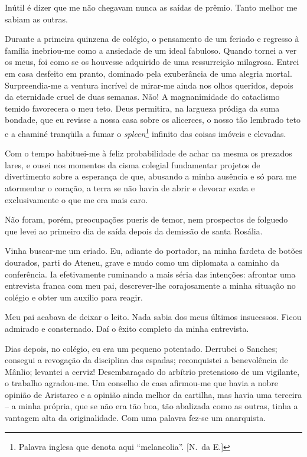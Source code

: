 Inútil é dizer que me não chegavam nunca as
saídas de prêmio. Tanto melhor me sabiam as outras. 

Durante a primeira
quinzena de colégio, o pensamento de um feriado e regresso à família
inebriou{}-me como a ansiedade de um ideal fabuloso. Quando tornei a ver
os meus, foi como se os houvesse adquirido de uma ressurreição
milagrosa. Entrei em casa desfeito em pranto, dominado pela exuberância
de uma alegria mortal. Surpreendia{}-me a ventura incrível de
mirar{}-me ainda nos olhos queridos, depois da eternidade cruel de duas
semanas. Não! A magnanimidade do cataclismo temido favorecera o meu
teto. Deus permitira, na largueza pródiga da suma bondade, que eu
revisse a nossa casa sobre os alicerces, o nosso tão lembrado teto e a
chaminé tranqüila a fumar o \textit{spleen}\footnote{ Palavra inglesa que denota aqui ``melancolia''. 
[N.~da E.]} infinito das coisas imóveis e elevadas. 

Com o tempo habituei{}-me à feliz probabilidade de achar na
mesma os prezados lares, e ousei nos momentos da cisma colegial
fundamentar projetos de divertimento sobre a esperança de que, abusando
a minha ausência e só para me atormentar o coração, a terra se não
havia de abrir e devorar exata e exclusivamente o que me era mais caro.

Não foram, porém, preocupações pueris de temor, nem prospectos de
folguedo que levei ao primeiro dia de saída depois da demissão de santa
Rosália. 

Vinha buscar{}-me um criado. Eu, adiante do portador, na minha
fardeta de botões dourados, parti do Ateneu, grave e mudo como um
diplomata a caminho da conferência. Ia efetivamente ruminando a mais
séria das intenções: afrontar uma entrevista franca com meu pai,
descrever{}-lhe corajosamente a minha situação no colégio e obter um
auxílio para reagir. 

Meu pai acabava de deixar o leito. Nada sabia dos
meus últimos insucessos. Ficou admirado e consternado. Daí o êxito completo 
da minha entrevista. 

Dias depois, no colégio, eu era um pequeno potentado. 
Derrubei o Sanches; consegui a
revogação da disciplina das espadas; reconquistei a benevolência de
Mânlio; levantei a cerviz! Desembaraçado do arbítrio pretensioso de um
vigilante, o trabalho agradou{}-me. Um conselho de casa afirmou{}-me
que havia a nobre opinião de Aristarco e a opinião ainda melhor da
cartilha, mas havia uma terceira -- a minha própria, que se não era
tão boa, tão abalizada como as outras, tinha a vantagem alta da
originalidade. Com uma palavra fez{}-se um anarquista. 

